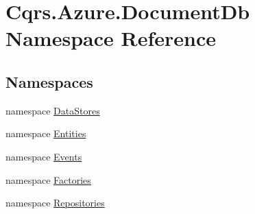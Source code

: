 \hypertarget{namespaceCqrs_1_1Azure_1_1DocumentDb}{}\section{Cqrs.\+Azure.\+Document\+Db Namespace Reference}
\label{namespaceCqrs_1_1Azure_1_1DocumentDb}
\subsection*{Namespaces}
\begin{DoxyCompactItemize}
\item 
namespace \hyperlink{namespaceCqrs_1_1Azure_1_1DocumentDb_1_1DataStores}{Data\+Stores}
\item 
namespace \hyperlink{namespaceCqrs_1_1Azure_1_1DocumentDb_1_1Entities}{Entities}
\item 
namespace \hyperlink{namespaceCqrs_1_1Azure_1_1DocumentDb_1_1Events}{Events}
\item 
namespace \hyperlink{namespaceCqrs_1_1Azure_1_1DocumentDb_1_1Factories}{Factories}
\item 
namespace \hyperlink{namespaceCqrs_1_1Azure_1_1DocumentDb_1_1Repositories}{Repositories}
\end{DoxyCompactItemize}

